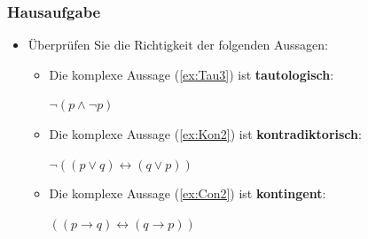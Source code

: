 \begin{frame}
\frametitle{Hausaufgabe}
\begin{itemize}
	\item Überprüfen Sie die Richtigkeit der folgenden Aussagen:
	
	\vspace{1em}
	
	\begin{itemize}
		\item Die komplexe Aussage (\ref{ex:Tau3}) ist \textbf{tautologisch}:
		
		\ea\label{ex:Tau3} $\lnot (p \land \lnot p)$
		\z
		
		\item Die komplexe Aussage (\ref{ex:Kon2}) ist \textbf{kontradiktorisch}:
		
		\ea\label{ex:Kon2} $\lnot ((p \lor q) \leftrightarrow (q \lor p))$
		\z
		
		\item Die komplexe Aussage (\ref{ex:Con2}) ist \textbf{kontingent}:
		
		\ea\label{ex:Con2} $((p \rightarrow q) \leftrightarrow (q \rightarrow p))$
		\z
		
	\end{itemize}	
	
\end{itemize}

\end{frame}

